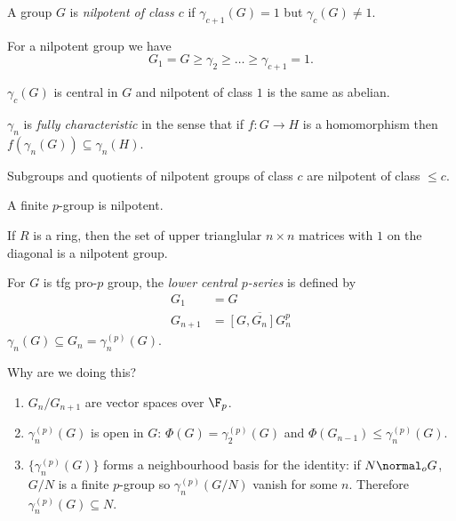 \documentclass[a4paper]{article}
\begin{document}
\begin{definition}
  A group \(G\) is \emph{nilpotent of class \(c\)} if \(\gamma_{c + 1}(G) = 1\) but \(\gamma_c(G) \ne 1\).
\end{definition}

For a nilpotent group we have
\[
  G_1 = G \geq \gamma_2 \geq \dots \geq \gamma_{c + 1} = 1.
\]

\begin{note}
  \(\gamma_c(G)\) is central in \(G\) and nilpotent of class \(1\) is the same as abelian.
\end{note}

\begin{proposition}
  \(\gamma_n\) is \emph{fully characteristic} in the sense that if \(f: G \to H\) is a homomorphism then \(f(\gamma_n(G)) \subseteq \gamma_n(H)\).
\end{proposition}

\begin{proposition}
  Subgroups and quotients of nilpotent groups of class \(c\) are nilpotent of class \(\leq c\).
\end{proposition}

\begin{proposition}
  A finite \(p\)-group is nilpotent.
\end{proposition}

\begin{ex}
  If \(R\) is a ring, then the set of upper trianglular \(n \times n\) matrices with \(1\) on the diagonal is a nilpotent group.
\end{ex}

\begin{definition}
  For \(G\) is tfg pro-\(p\) group, the \emph{lower central \(p\)-series} is defined by
  \begin{align*}
    G_1 &= G \\
    G_{n + 1} &= \overline{[G, G_n] G_n^p}
  \end{align*}
  \(\gamma_n(G) \subseteq G_n = \gamma_n^{(p)}(G)\).
\end{definition}

Why are we doing this?
\begin{enumerate}
\item \(G_n/G_{n + 1}\) are vector spaces over \(\F_p\).
\item \(\gamma_n^{(p)}(G)\) is open in \(G\): \(\Phi(G) = \gamma_2^{(p)}(G)\) and \(\Phi(G_{n - 1}) \leq \gamma_n^{(p)}(G)\).
\item \(\{\gamma_n^{(p)}(G)\}\) forms a neighbourhood basis for the identity: if \(N \normal_o G\), \(G/N\) is a finite \(p\)-group so \(\gamma_n^{(p)}(G/N)\) vanish for some \(n\). Therefore \(\gamma_n^{(p)}(G) \subseteq N\).
\end{enumerate}
\end{document}
